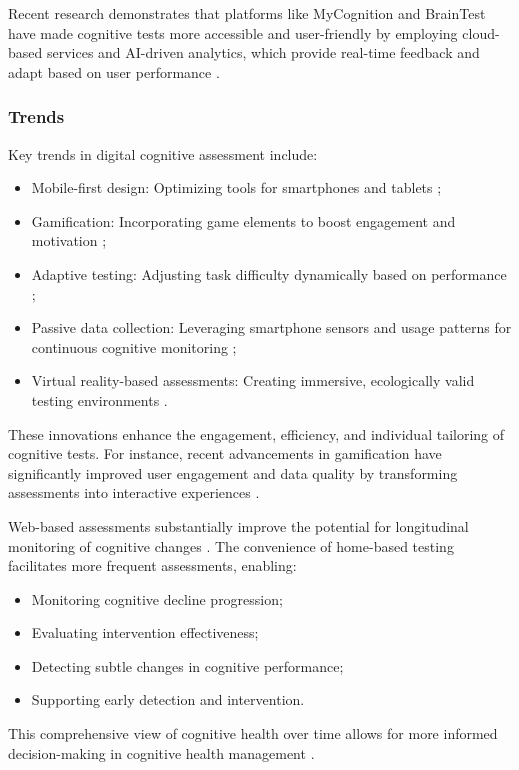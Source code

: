 Recent research demonstrates that platforms like MyCognition and BrainTest have made cognitive tests more accessible and user-friendly by employing cloud-based services and AI-driven analytics, which provide real-time feedback and adapt based on user performance \cite{Wild2021, Grassi2019}.

\subsubsection{Trends}
Key trends in digital cognitive assessment include:
\begin{itemize}
    \item Mobile-first design: Optimizing tools for smartphones and tablets \cite{Zygouris2017};
    \item Gamification: Incorporating game elements to boost engagement and motivation \cite{Lumsden2016};
    \item Adaptive testing: Adjusting task difficulty dynamically based on performance \cite{Finkelman2016};
    \item Passive data collection: Leveraging smartphone sensors and usage patterns for continuous cognitive monitoring \cite{Dagum2018};
    \item Virtual reality-based assessments: Creating immersive, ecologically valid testing environments \cite{Parsons2018}.
\end{itemize}

These innovations enhance the engagement, efficiency, and individual tailoring of cognitive tests. For instance, recent advancements in gamification have significantly improved user engagement and data quality by transforming assessments into interactive experiences \cite{Bowers2021}.

Web-based assessments substantially improve the potential for longitudinal monitoring of cognitive changes \cite{Wild2021}. The convenience of home-based testing facilitates more frequent assessments, enabling:
\begin{itemize}
    \item Monitoring cognitive decline progression;
    \item Evaluating intervention effectiveness;
    \item Detecting subtle changes in cognitive performance;
    \item Supporting early detection and intervention.
\end{itemize}

This comprehensive view of cognitive health over time allows for more informed decision-making in cognitive health management \cite{Zygouris2017}.

